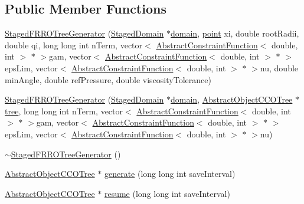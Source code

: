 \subsection*{Public Member Functions}
\begin{DoxyCompactItemize}
\item 
\hyperlink{class_staged_f_r_r_o_tree_generator_a00f41805e256a579e91c4519fab7b016}{Staged\+F\+R\+R\+O\+Tree\+Generator} (\hyperlink{class_staged_domain}{Staged\+Domain} $\ast$\hyperlink{class_staged_f_r_r_o_tree_generator_a2f8616a24551a7a414b51b805309894a}{domain}, \hyperlink{structpoint}{point} xi, double root\+Radii, double qi, long long int n\+Term, vector$<$ \hyperlink{class_abstract_constraint_function}{Abstract\+Constraint\+Function}$<$ double, int $>$ $\ast$ $>$gam, vector$<$ \hyperlink{class_abstract_constraint_function}{Abstract\+Constraint\+Function}$<$ double, int $>$ $\ast$ $>$eps\+Lim, vector$<$ \hyperlink{class_abstract_constraint_function}{Abstract\+Constraint\+Function}$<$ double, int $>$ $\ast$ $>$nu, double min\+Angle, double ref\+Pressure, double viscosity\+Tolerance)
\item 
\hyperlink{class_staged_f_r_r_o_tree_generator_a3dc2c3e1959e0df5d1a46c696acdcf0a}{Staged\+F\+R\+R\+O\+Tree\+Generator} (\hyperlink{class_staged_domain}{Staged\+Domain} $\ast$\hyperlink{class_staged_f_r_r_o_tree_generator_a2f8616a24551a7a414b51b805309894a}{domain}, \hyperlink{class_abstract_object_c_c_o_tree}{Abstract\+Object\+C\+C\+O\+Tree} $\ast$\hyperlink{class_staged_f_r_r_o_tree_generator_a3d7a0b0194b93d4c2706a21908ad9f09}{tree}, long long int n\+Term, vector$<$ \hyperlink{class_abstract_constraint_function}{Abstract\+Constraint\+Function}$<$ double, int $>$ $\ast$ $>$gam, vector$<$ \hyperlink{class_abstract_constraint_function}{Abstract\+Constraint\+Function}$<$ double, int $>$ $\ast$ $>$eps\+Lim, vector$<$ \hyperlink{class_abstract_constraint_function}{Abstract\+Constraint\+Function}$<$ double, int $>$ $\ast$ $>$nu)
\item 
\hyperlink{class_staged_f_r_r_o_tree_generator_ace0cc12588d7ca428520e5e08dfd5e83}{$\sim$\+Staged\+F\+R\+R\+O\+Tree\+Generator} ()
\item 
\hyperlink{class_abstract_object_c_c_o_tree}{Abstract\+Object\+C\+C\+O\+Tree} $\ast$ \hyperlink{class_staged_f_r_r_o_tree_generator_acdd7fefb4e091a21f870e305da66e4e1}{generate} (long long int save\+Interval)
\item 
\hyperlink{class_abstract_object_c_c_o_tree}{Abstract\+Object\+C\+C\+O\+Tree} $\ast$ \hyperlink{class_staged_f_r_r_o_tree_generator_a32d59d858cf3859dc0ed4db13f2a8642}{resume} (long long int save\+Interval)

\end{DoxyCompactItemize}
